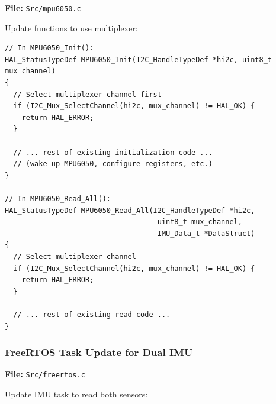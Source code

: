 \documentclass[11pt,a4paper]{article}
\begin{document}
\textbf{File:} \texttt{Src/mpu6050.c}

Update functions to use multiplexer:

\begin{lstlisting}[caption=MPU6050 with Multiplexer Support, label=lst:mpu6050mux]
// In MPU6050_Init():
HAL_StatusTypeDef MPU6050_Init(I2C_HandleTypeDef *hi2c, uint8_t mux_channel)
{
  // Select multiplexer channel first
  if (I2C_Mux_SelectChannel(hi2c, mux_channel) != HAL_OK) {
    return HAL_ERROR;
  }
  
  // ... rest of existing initialization code ...
  // (wake up MPU6050, configure registers, etc.)
}

// In MPU6050_Read_All():
HAL_StatusTypeDef MPU6050_Read_All(I2C_HandleTypeDef *hi2c, 
                                    uint8_t mux_channel,
                                    IMU_Data_t *DataStruct)
{
  // Select multiplexer channel
  if (I2C_Mux_SelectChannel(hi2c, mux_channel) != HAL_OK) {
    return HAL_ERROR;
  }
  
  // ... rest of existing read code ...
}
\end{lstlisting}

\subsubsection{FreeRTOS Task Update for Dual IMU}

\textbf{File:} \texttt{Src/freertos.c}

Update IMU task to read both sensors:
\end{document}
